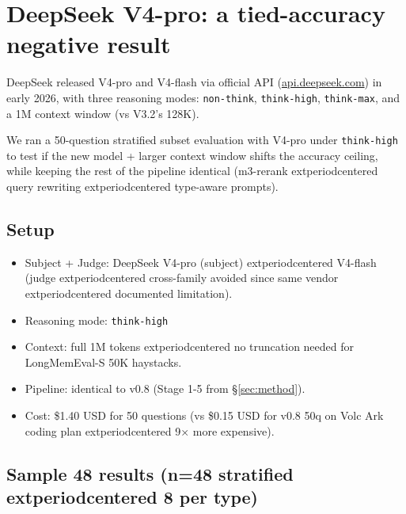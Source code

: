 
\section{DeepSeek V4-pro: a tied-accuracy negative result}
\label{app:deepseek-v4}

DeepSeek released V4-pro and V4-flash via official API
(\url{api.deepseek.com}) in early 2026, with three reasoning modes:
\texttt{non-think}, \texttt{think-high}, \texttt{think-max}, and a 1M
context window (vs V3.2's 128K).

We ran a 50-question stratified subset evaluation with V4-pro under
\texttt{think-high} to test if the new model + larger context window
shifts the accuracy ceiling, while keeping the rest of the pipeline
identical (m3-rerank 	extperiodcentered{}  query rewriting 	extperiodcentered{}  type-aware prompts).

\subsection{Setup}

\begin{itemize}
\item Subject + Judge: DeepSeek V4-pro (subject) 	extperiodcentered{}  V4-flash (judge 	extperiodcentered{} 
  cross-family avoided since same vendor 	extperiodcentered{}  documented limitation).
\item Reasoning mode: \texttt{think-high}
\item Context: full 1M tokens 	extperiodcentered{}  no truncation needed for LongMemEval-S
  50K haystacks.
\item Pipeline: identical to v0.8 (Stage 1-5 from §\ref{sec:method}).
\item Cost: \$1.40 USD for 50 questions (vs \$0.15 USD for v0.8 50q
  on Volc Ark coding plan 	extperiodcentered{}  9× more expensive).
\end{itemize}

\subsection{Sample 48 results (n=48 stratified 	extperiodcentered{}  8 per type)}

